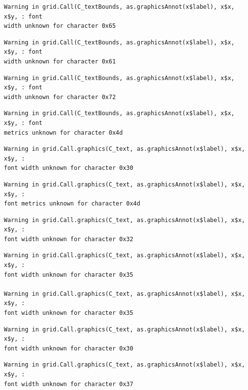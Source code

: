 \documentclass[
  letterpaper,
  DIV=11,
  numbers=noendperiod]{scrreprt}
\begin{document}
\begin{verbatim}
Warning in grid.Call(C_textBounds, as.graphicsAnnot(x$label), x$x, x$y, : font
width unknown for character 0x65
\end{verbatim}

\begin{verbatim}
Warning in grid.Call(C_textBounds, as.graphicsAnnot(x$label), x$x, x$y, : font
width unknown for character 0x61
\end{verbatim}

\begin{verbatim}
Warning in grid.Call(C_textBounds, as.graphicsAnnot(x$label), x$x, x$y, : font
width unknown for character 0x72
\end{verbatim}

\begin{verbatim}
Warning in grid.Call(C_textBounds, as.graphicsAnnot(x$label), x$x, x$y, : font
metrics unknown for character 0x4d
\end{verbatim}

\begin{verbatim}
Warning in grid.Call.graphics(C_text, as.graphicsAnnot(x$label), x$x, x$y, :
font width unknown for character 0x30
\end{verbatim}

\begin{verbatim}
Warning in grid.Call.graphics(C_text, as.graphicsAnnot(x$label), x$x, x$y, :
font metrics unknown for character 0x4d
\end{verbatim}

\begin{verbatim}
Warning in grid.Call.graphics(C_text, as.graphicsAnnot(x$label), x$x, x$y, :
font width unknown for character 0x32
\end{verbatim}

\begin{verbatim}
Warning in grid.Call.graphics(C_text, as.graphicsAnnot(x$label), x$x, x$y, :
font width unknown for character 0x35

Warning in grid.Call.graphics(C_text, as.graphicsAnnot(x$label), x$x, x$y, :
font width unknown for character 0x35
\end{verbatim}

\begin{verbatim}
Warning in grid.Call.graphics(C_text, as.graphicsAnnot(x$label), x$x, x$y, :
font width unknown for character 0x30
\end{verbatim}

\begin{verbatim}
Warning in grid.Call.graphics(C_text, as.graphicsAnnot(x$label), x$x, x$y, :
font width unknown for character 0x37
\end{verbatim}
\end{document}
